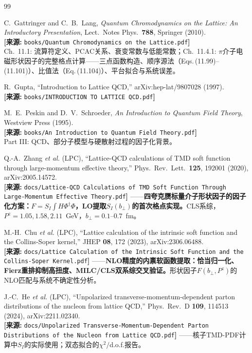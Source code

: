 \documentclass[12pt,a4paper]{ctexart}
\theoremstyle{definition}
\begin{document}
\begin{thebibliography}{99}

C.~Gattringer and C.~B.~Lang,
\textit{Quantum Chromodynamics on the Lattice: An Introductory Presentation},
Lect.\ Notes Phys.\ \textbf{788}, Springer (2010).
\\\textbf{[来源:} \texttt{books/Quantum Chromodynamics on the Lattice.pdf}\textbf{]}
\\Ch.~11.1: 流算符定义、PCAC关系、衰变常数与低能常数；Ch.~11.4.1: $\pi$介子电磁形状因子的完整格点计算——三点函数构造、顺序源法（Eqs.\,(11.99)--(11.101)）、比值法（Eq.\,(11.104)）、平台拟合与系统误差。

R.~Gupta,
``Introduction to Lattice QCD,''
arXiv:hep-lat/9807028 (1997).
\\\textbf{[来源:} \texttt{books/INTRODUCTION TO LATTICE QCD.pdf}\textbf{]}

M.~E.~Peskin and D.~V.~Schroeder,
\textit{An Introduction to Quantum Field Theory},
Westview Press (1995).
\\\textbf{[来源:} \texttt{books/An Introduction to Quantum Field Theory.pdf}\textbf{]}
\\Part III: QCD、部分子模型与硬散射过程的因子化背景。

Q.-A.~Zhang \textit{et al.} (LPC),
``Lattice-QCD calculations of TMD soft function through large-momentum effective theory,''
Phys.\ Rev.\ Lett.\ \textbf{125}, 192001 (2020), arXiv:2005.14572.
\\\textbf{[来源:} \texttt{docs/Lattice-QCD Calculations of TMD Soft Function Through Large-Momentum Effective Theory.pdf}\textbf{]}
——\textbf{四夸克赝标量介子形状因子的因子化方案：$F = S_I \int H \Phi^\dagger \Phi$，LO提取$S_I(b_\perp)$的首次格点实现。}CLS系综，$P^z = 1.05, 1.58, 2.11$~GeV，$b_\perp = 0.1\text{--}0.7$~fm。

M.-H.~Chu \textit{et al.} (LPC),
``Lattice calculation of the intrinsic soft function and the Collins-Soper kernel,''
JHEP \textbf{08}, 172 (2023), arXiv:2306.06488.
\\\textbf{[来源:} \texttt{docs/Lattice Calculation of the Intrinsic Soft Function and the Collins-Soper Kernel.pdf}\textbf{]}
——\textbf{NLO精度的内禀软函数提取：恰当归一化、Fierz重排抑制高扭度、MILC/CLS双系综交叉验证。}形状因子$F(b_\perp, P^z)$的NLO匹配与系统不确定性分析。

J.-C.~He \textit{et al.} (LPC),
``Unpolarized transverse-momentum-dependent parton distributions of the nucleon from lattice QCD,''
Phys.\ Rev.\ D \textbf{109}, 114513 (2024), arXiv:2211.02340.
\\\textbf{[来源:} \texttt{docs/Unpolarized Transverse-Momentum-Dependent Parton Distributions of the Nucleon from Lattice QCD.pdf}\textbf{]}
——核子TMD-PDF计算中$S_I$的实际使用；双态拟合的$\chi^2/$d.o.f.报告。


\end{thebibliography}
\end{document}
